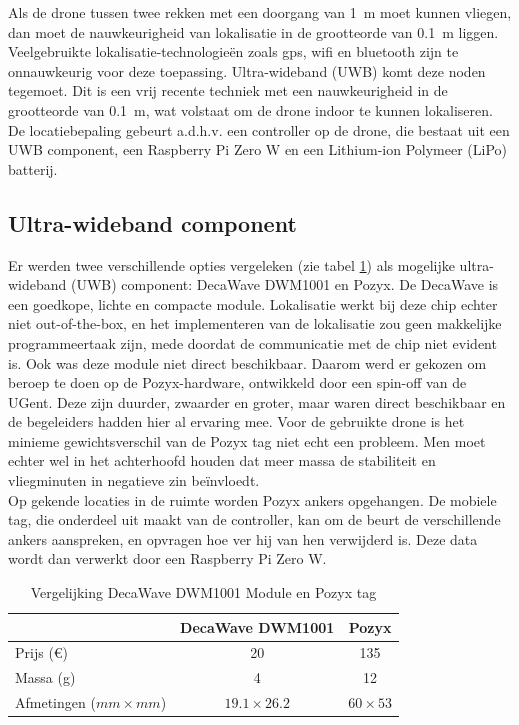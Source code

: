 Als de drone tussen twee rekken met een doorgang van \SI{1}{\m} moet kunnen vliegen, dan moet de nauwkeurigheid van lokalisatie in de grootteorde van \SI{0.1}{\m} liggen.
Veelgebruikte lokalisatie-technologieën zoals gps, wifi en bluetooth zijn te onnauwkeurig voor deze toepassing.
Ultra-wideband (UWB) komt deze noden tegemoet.
Dit is een vrij recente techniek met een nauwkeurigheid in de grootteorde van \SI{0.1}{\m}, wat volstaat om de drone indoor te kunnen lokaliseren.
De locatiebepaling gebeurt a.d.h.v. een controller op de drone, die bestaat uit een UWB component, een Raspberry Pi Zero W en een Lithium-ion Polymeer (LiPo) batterij.\\

\subsection{Ultra-wideband component} \label{sec:uwb}
Er werden twee verschillende opties vergeleken (zie tabel \ref{tab:decavspozyx}) als mogelijke ultra-wideband (UWB) component: DecaWave DWM1001 en Pozyx.
De DecaWave is een goedkope, lichte en compacte module. Lokalisatie werkt bij deze chip echter niet out-of-the-box, en het implementeren van de lokalisatie zou geen makkelijke programmeertaak zijn, mede doordat de communicatie met de chip niet evident is.
Ook was deze module niet direct beschikbaar.
Daarom werd er gekozen om beroep te doen op de Pozyx-hardware, ontwikkeld door een spin-off van de UGent.
Deze zijn duurder, zwaarder en groter, maar waren direct beschikbaar en de begeleiders hadden hier al ervaring mee.
Voor de gebruikte drone is het minieme gewichtsverschil van de Pozyx tag niet echt een probleem. Men moet echter wel in het achterhoofd houden dat meer massa de stabiliteit en vliegminuten in negatieve zin be\"invloedt.\\

Op gekende locaties in de ruimte worden Pozyx ankers opgehangen.
De mobiele tag, die onderdeel uit maakt van de controller, kan om de beurt de verschillende ankers aanspreken, en opvragen hoe ver hij van hen verwijderd is.
Deze data wordt dan verwerkt door een Raspberry Pi Zero W.
\begin{table}[p]
	\centering
	\begin{tabular}{ | l | c | c | } \hline
		& DecaWave DWM1001 & Pozyx \\
		\hline 
		\hline
		Prijs (\euro{}) & 20 & 135 \\ 
		\hline
		Massa (g) & 4 & 12 \\ 
		\hline
		Afmetingen ($mm \times mm$) & $19.1 \times 26.2$ & $60 \times 53$ \\ 
		\hline
	\end{tabular}
	\caption[Vergelijking DecaWave DWM1001 Module en Pozyx tag]{Vergelijking DecaWave DWM1001 Module en Pozyx tag}
	\label{tab:decavspozyx}
\end{table}

